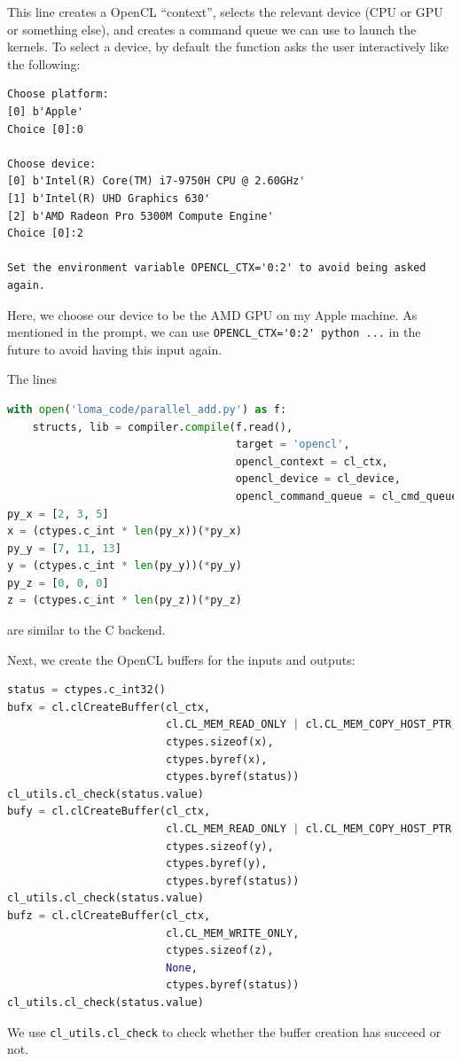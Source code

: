 This line creates a OpenCL ``context'', selects the relevant device (CPU or GPU or something else), and creates a command queue we can use to launch the kernels. To select a device, by default the function asks the user interactively like the following:
\begin{lstlisting}
Choose platform:
[0] b'Apple'
Choice [0]:0

Choose device:
[0] b'Intel(R) Core(TM) i7-9750H CPU @ 2.60GHz'
[1] b'Intel(R) UHD Graphics 630'
[2] b'AMD Radeon Pro 5300M Compute Engine'
Choice [0]:2

Set the environment variable OPENCL_CTX='0:2' to avoid being asked again.
\end{lstlisting}
Here, we choose our device to be the AMD GPU on my Apple machine. As mentioned in the prompt, we can use \lstinline{OPENCL_CTX='0:2' python ...} in the future to avoid having this input again.

The lines 
\begin{lstlisting}[language=python]
with open('loma_code/parallel_add.py') as f:
    structs, lib = compiler.compile(f.read(),
                                    target = 'opencl',
                                    opencl_context = cl_ctx,
                                    opencl_device = cl_device,
                                    opencl_command_queue = cl_cmd_queue)
py_x = [2, 3, 5]
x = (ctypes.c_int * len(py_x))(*py_x)
py_y = [7, 11, 13]
y = (ctypes.c_int * len(py_y))(*py_y)
py_z = [0, 0, 0]
z = (ctypes.c_int * len(py_z))(*py_z)
\end{lstlisting}
are similar to the C backend.

Next, we create the OpenCL buffers for the inputs and outputs:
\begin{lstlisting}[language=python]
status = ctypes.c_int32()
bufx = cl.clCreateBuffer(cl_ctx,
                         cl.CL_MEM_READ_ONLY | cl.CL_MEM_COPY_HOST_PTR,
                         ctypes.sizeof(x),
                         ctypes.byref(x),
                         ctypes.byref(status))
cl_utils.cl_check(status.value)
bufy = cl.clCreateBuffer(cl_ctx,
                         cl.CL_MEM_READ_ONLY | cl.CL_MEM_COPY_HOST_PTR,
                         ctypes.sizeof(y),
                         ctypes.byref(y),
                         ctypes.byref(status))
cl_utils.cl_check(status.value)
bufz = cl.clCreateBuffer(cl_ctx,
                         cl.CL_MEM_WRITE_ONLY,
                         ctypes.sizeof(z),
                         None,
                         ctypes.byref(status))
cl_utils.cl_check(status.value)
\end{lstlisting}
We use \lstinline{cl_utils.cl_check} to check whether the buffer creation has succeed or not.

